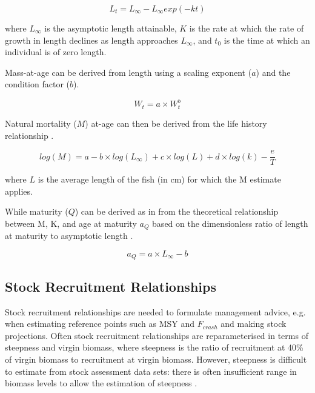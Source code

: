 \documentclass[preprint,authoryear,12pt]{elsarticle}
\begin{document}
\begin{equation} L_t = L_{\infty} - L_{\infty}exp(-kt) \end{equation} 
 
where $L_{\infty}$ is the asymptotic length attainable, $K$ is the rate at which the rate of growth in length declines as length approaches $L_{\infty}$, and $t_{0}$ is the time at 
which an individual is of zero length. 
 
Mass-at-age can be derived from length using a scaling exponent ($a$) and the condition factor ($b$). 
 
\begin{equation} W_t = a \times W_t^b \end{equation} 
 
 
Natural mortality ($M$) at-age can then be derived from the life history relationship \citet{gislason2008does}. 
 
\begin{equation} 
log(M) = a - b \times log(L_{\infty}) + c \times log(L) + d \times log(k) - \frac{e}{T} 
\end{equation}  
 
where $L$ is the average length of the fish (in cm) for which the M estimate applies. 
 
While maturity ($Q$) can be derived as in \citet{williams2003implications} from the theoretical relationship between M, K, and age at maturity $a_{Q}$  
based on the dimensionless ratio of length at maturity to asymptotic length \citep{beverton1992patterns}.  
 
\begin{equation} 
a_{Q}=a \times L_{\infty}-b 
\end{equation}  
 
\subsection{Stock Recruitment Relationships} 
 
Stock recruitment relationships are needed to formulate management advice, e.g. when estimating reference points such as MSY and $F_{crash}$ and making stock projections. 
Often stock recruitment relationships are reparameterised in terms of steepness and virgin biomass, where steepness  
is the ratio of recruitment at 40\% of virgin biomass to recruitment at virgin biomass. However, steepness is difficult to estimate from  
stock assessment data sets: there is often insufficient range in biomass levels to allow the estimation of steepness \citet{ISSF2011steep}. 
 
\end{document}
